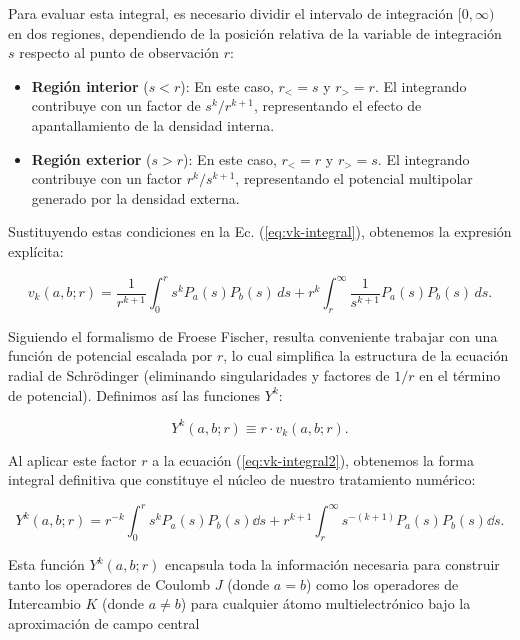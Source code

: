 \documentclass[12pt, a4paper, oneside, spanish]{book}
\begin{document}
Para evaluar esta integral, es necesario dividir el intervalo de integración $[0,\infty)$ en dos regiones, dependiendo de la posición relativa de la variable de integración $s$ respecto al punto de observación $r$:

\begin{itemize}
\item \textbf{Región interior} ($s < r$): En este caso, $r_< = s$ y $r_> = r$. El integrando contribuye con un factor de $s^k/r^{k+1}$, representando el efecto de apantallamiento de la densidad interna.
\item \textbf{Región exterior} ($s > r$): En este caso, $r_< = r$ y $r_> = s$. El integrando contribuye con un factor $r^k/s^{k+1}$, representando el potencial multipolar generado por la densidad externa.
\end{itemize}

Sustituyendo estas condiciones en la Ec. (\cref{eq:vk-integral}), obtenemos la expresión explícita:

\begin{equation}
 \label{eq:vk-integral2}
 v_k(a, b; r) = \frac{1}{r^{k+1}} \int_0^r s^k P_a(s) P_b(s) \, ds + r^k \int_r^{\infty} \frac{1}{s^{k+1}} P_a(s) P_b(s) \, ds.
\end{equation}

Siguiendo el formalismo de Froese Fischer, resulta conveniente trabajar con una función de potencial escalada por $r$, lo cual simplifica la estructura de la ecuación radial de Schrödinger (eliminando singularidades y factores de $1/r$ en el término de potencial). Definimos así las funciones $Y^k$:

\begin{equation}
 \label{eq:yk-pot}
 Y^k(a,b;r) \equiv r \cdot v_k(a,b;r).
\end{equation}

Al aplicar este factor $r$ a la ecuación (\cref{eq:vk-integral2}), obtenemos la forma integral definitiva que constituye el núcleo de nuestro tratamiento numérico:

\begin{equation}
\label{eq:Yk-final}
 Y^k(a,b;r) = r^{-k}\int_0^r s^kP_a(s)P_b(s) \dd{s} + r^{k+1} \int_r^{\infty} s^{-(k+1)}P_a(s)P_b(s)\dd{s}.
\end{equation}

Esta función $Y^k(a,b;r)$ encapsula toda la información necesaria para construir tanto los operadores de Coulomb $J$ (donde $a=b$) como los operadores de Intercambio $K$ (donde $a \neq b$) para cualquier átomo multielectrónico bajo la aproximación de campo central
\end{document}
